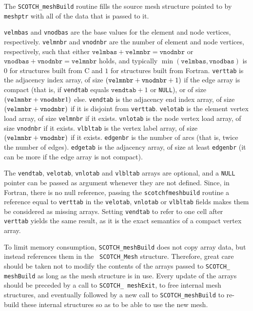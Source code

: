 \begin{itemize}
\progdes

The {\tt SCOTCH\_meshBuild} routine fills the source mesh structure
pointed to by {\tt meshptr} with all of the data that is passed to it.

{\tt velmbas} and {\tt vnodbas} are the base values for the element
and node vertices, respectively.
{\tt velmnbr} and {\tt vnodnbr} are the number of element and node
vertices, respectively, such that either $\mathtt{velmbas}
+\mathtt{velmnbr}=\mathtt{vnodnbr}$ or $\mathtt{vnodbas}
+\mathtt{vnodnbr}=\mathtt{velmnbr}$ holds, and typically
$\min(\mathtt{velmbas}, \mathtt{vnodbas})$ is $0$ for
structures built from C and $1$ for structures built from Fortran.
{\tt verttab} is the adjacency index array, of size $({\tt velmnbr} +
{\tt vnodnbr} + 1)$ if the edge array is compact (that is, if
{\tt vendtab} equals $\mathtt{vendtab}+1$ or {\tt NULL}), or of
size $({\tt velmnbr} + {\tt vnodnbr}1)$ else.
{\tt vendtab} is the adjacency end index array, of size $({\tt velmnbr} +
{\tt vnodnbr})$ if it is disjoint from {\tt verttab}.
{\tt velotab} is the element vertex load array, of size {\tt velmnbr}
if it exists.
{\tt vnlotab} is the node vertex load array, of size {\tt vnodnbr} if
it exists.
{\tt vlbltab} is the vertex label array, of size $({\tt velmnbr} +
{\tt vnodnbr})$ if it exists.
{\tt edgenbr} is the number of arcs (that is, twice the number of edges).
{\tt edgetab} is the adjacency array, of size at least {\tt edgenbr}
(it can be more if the edge array is not compact).

The {\tt vendtab}, {\tt velotab}, {\tt vnlotab} and {\tt vlbltab}
arrays are optional, and a {\tt NULL} pointer can be passed as
argument whenever they are not defined.
Since, in Fortran, there is no null reference, passing the
{\tt scotchf\lbt mesh\lbt build} routine a reference equal to
{\tt verttab} in the {\tt velotab}, {\tt vnlotab} or {\tt vlbltab}
fields makes them be considered as missing arrays. Setting
{\tt vendtab} to refer to one cell after {\tt verttab} yields the
same result, as it is the exact semantics of a compact vertex array.

To limit memory consumption, {\tt SCOTCH\_\lbt mesh\lbo Build} does
not copy array data, but instead references them in the {\tt
SCOTCH\_\lbt Mesh} structure. Therefore, great care should be taken
not to modify the contents of the arrays passed to {\tt SCOTCH\_\lbt
mesh\lbo Build} as long as the mesh structure is in use. Every
update of the arrays should be preceded by a call to {\tt SCOTCH\_\lbt
mesh\lbo Exit}, to free internal mesh structures, and eventually
followed by a new call to {\tt SCOTCH\_\lbt mesh\lbo Build} to
re-build these internal structures so as to be able to use the new
mesh.


\end{itemize}
